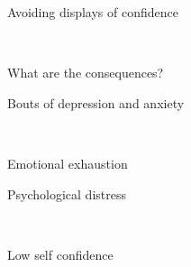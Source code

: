 \documentclass[aspectratio=169]{beamer}
\begin{document}
\begin{frame}
  \begin{center}
    \Huge Avoiding displays of confidence

    \\ \small \cite{clanceimes78}
  \end{center}
\end{frame}

\begin{frame}
  \begin{center}
    \Huge What are the consequences?
  \end{center}
\end{frame}

\begin{frame}
  \begin{center}
    \Huge Bouts of depression and anxiety

    \\ \small \cite{hh15}
  \end{center}
\end{frame}

\begin{frame}
  \begin{center}
    \Huge Emotional exhaustion
    \\ \small \cite{hh15}
  \end{center}
\end{frame}


\begin{frame}
  \begin{center}
    \Huge Psychological distress

    \\ \small \cite{hh15}
  \end{center}
\end{frame}

\begin{frame}
  \begin{center}
    \Huge Low self confidence

    \\ \small \cite{hh15}
  \end{center}
\end{frame}
\end{document}

